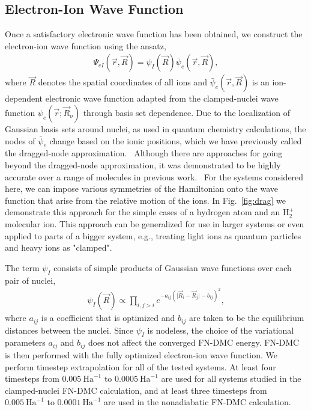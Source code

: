 \documentclass[aip,jcp,numerical,reprint]{revtex4-1}
\begin{document}
\subsection{Electron-Ion Wave Function}

Once a satisfactory electronic wave function has been obtained, we construct the electron-ion wave function using the ansatz,
\begin{align}
\Psi_{eI}(\vec{r},\vec{R})=\psi_I(\vec{R})\bar{\psi}_e(\vec{r},\vec{R}), \label{eq:psi}
\end{align}
where $\vec{R}$ denotes the spatial coordinates of all ions and $\bar{\psi}_e(\vec{r},\vec{R})$ is an ion-dependent electronic wave function adapted from the clamped-nuclei wave function $\psi_e(\vec{r};\vec{R}_o)$ through basis set dependence. Due to the localization of Gaussian basis sets around nuclei, as used in quantum chemistry calculations, the nodes of $\bar{\psi}_e$ change based on the ionic positions, which we have previously called the dragged-node approximation.~\cite{Tubman_ECG}
Although there are approaches for going beyond the dragged-node approximation, it was demonstrated to be highly accurate over a range of molecules in previous work.~\cite{Tubman_ECG} For the systems considered here, we can impose various symmetries of the Hamiltonian onto the wave function that arise from the relative motion of the ions. In Fig.~\ref{fig:drag} we demonstrate this approach for the simple cases of a hydrogen atom and an H$_2^+$ molecular ion. This approach can be generalized for use in larger systems or even applied to parts of a bigger system, e.g., treating light ions as quantum particles and heavy ions as "clamped".

The term $\psi_I$ consists of simple products of Gaussian wave functions over each pair of nuclei,
\begin{align}
\psi_I(\vec{R})\propto \prod\limits_{i,j>i}e^{-a_{ij}(\vert \vec{R}_i-\vec{R}_j\vert-b_{ij})^2},
\label{wfs_ions}
\end{align}
where $a_{ij}$ is a coefficient that is optimized and $b_{ij}$ are taken to be the equilibrium distances between the nuclei. Since $\psi_I$ is nodeless, the choice of the variational parameters $a_{ij}$ and $b_{ij}$ does not affect the converged FN-DMC energy. FN-DMC is then performed with the fully optimized electron-ion wave function. We perform timestep extrapolation for all of the tested systems. At least four timesteps from $0.005~\text{Ha}^{-1}$ to $0.0005~\text{Ha}^{-1}$ are used for all systems studied in the clamped-nuclei FN-DMC calculation, and at least three timesteps from $0.005~\text{Ha}^{-1}$ to $0.0001~\text{Ha}^{-1}$ are used in the nonadiabatic FN-DMC calculation.
\end{document}
